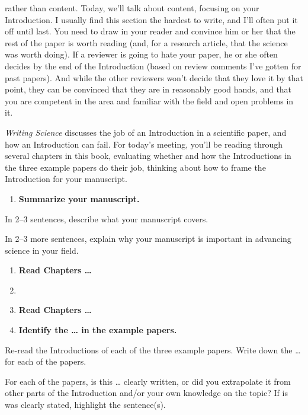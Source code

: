 \documentclass[]{tufte-book}
\providecommand{\tightlist}{%
  \setlength{\itemsep}{0pt}\setlength{\parskip}{0pt}}
\begin{document}
 rather than content. Today,
we'll talk about content, focusing on your Introduction. I usually find this
section the hardest to write, and I'll often put it off until last. You need to
draw in your reader and convince him or her that the rest of the paper is worth
reading (and, for a research article, that the science was worth doing). If a
reviewer is going to hate your paper, he or she often decides by the end of the
Introduction (based on review comments I've gotten for past papers). And while
the other reviewers won't decide that they love it by that point, they can be
convinced that they are in reasonably good hands, and that you are competent in
the area and familiar with the field and open problems in it.

\emph{Writing Science} discusses the job of an Introduction in a
scientific paper, and how an Introduction can fail. For today's meeting, you'll
be reading through several chapters in this book, evaluating whether and how the
Introductions in the three example papers do their job, thinking about how to frame
the Introduction for your manuscript.

\begin{enumerate}
\def\labelenumi{\arabic{enumi}.}
\tightlist
\item
  \textbf{Summarize your manuscript.}
\end{enumerate}

In 2--3 sentences, describe what your manuscript covers.

In 2--3 more sentences, explain why your manuscript is important in advancing
science in your field.

\begin{enumerate}
\def\labelenumi{\arabic{enumi}.}
\setcounter{enumi}{1}
\item
  \textbf{Read Chapters \ldots{}}
\item
\item
  \textbf{Read Chapters \ldots{}}
\item
  \textbf{Identify the \ldots{} in the example papers.}
\end{enumerate}

Re-read the Introductions of each of the three example papers. Write down the \ldots{}
for each of the papers.

For each of the papers, is this \ldots{} clearly written, or did you extrapolate it from
other parts of the Introduction and/or your own knowledge on the topic? If is was
clearly stated, highlight the sentence(s).
\end{document}
